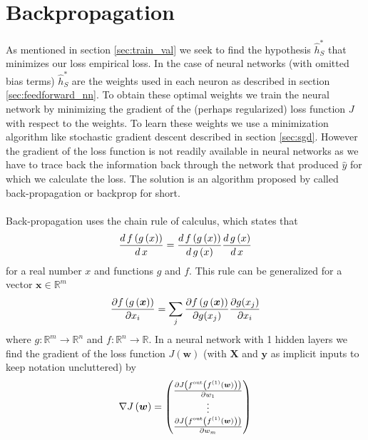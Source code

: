 \section{Backpropagation} \label{sec:backprop}
As mentioned in section \ref{sec:train_val} we seek to find the hypothesis $\hat{h}^*_S$ that minimizes our loss empirical loss. In the case of neural networks (with omitted bias terms) $\hat{h}^*_S$ are the weights used in each neuron as described in section \ref{sec:feedforward_nn}. To obtain these optimal weights we train the neural network by minimizing the gradient of the (perhaps regularized) loss function $J$ with respect to the weights. To learn these weights we use a minimization algorithm like stochastic gradient descent described in section \ref{sec:sgd}. However the gradient of the loss function is not readily available in neural networks as we have to trace back the information back through the network that produced $\hat{y}$ for which we calculate the loss. The solution is an algorithm proposed by \cite{Rumelhart:1986a} called back-propagation or backprop for short.\\
\\
Back-propagation uses the chain rule of calculus, which states that
\begin{equation*}
    \frac{d \, f\left (g\left (x\right)\right)}{d \, x} = \frac{d \, f\left (g\left (x\right)\right)}{d \, g \left (x\right)} \frac{d \, g\left (x\right)}{d \, x}
\end{equation*}
for a real number $x$ and functions $g$ and $f$. This rule can be generalized for a vector $\boldsymbol{x} \in \mathbb{R}^m$
\begin{equation*}
    \frac{\partial f\left (g\left (\boldsymbol{x}\right)\right)}{\partial x_i} = \sum_j \frac{\partial f\left (g\left (\boldsymbol{x}\right)\right)}{\partial g(x_j)} \frac{\partial g(x_j)}{\partial x_i}
\end{equation*}
where $g: \mathbb{R}^m \rightarrow \mathbb{R}^n$ and $f: \mathbb{R}^n \rightarrow \mathbb{R}$. In a neural network with 1 hidden layers we find the gradient of the loss function $J(\boldsymbol{w})$ (with $\boldsymbol{X}$ and $\boldsymbol{y}$ as implicit inputs to keep notation uncluttered) by
\begin{equation} \label{eq:loss_grad}
    \nabla J\left (\boldsymbol{w}\right) = \begin{pmatrix}
    \frac{\partial J\left (f^{\text{out}} \left (f^{(1)}\left (\boldsymbol{w}\right)\right)\right)}{\partial w_1} \\
    \vdots\\
    \frac{\partial J\left (f^{\text{out}} \left (f^{(1)}\left (\boldsymbol{w}\right)\right)\right)}{\partial w_m}
    \end{pmatrix}
\end{equation}
